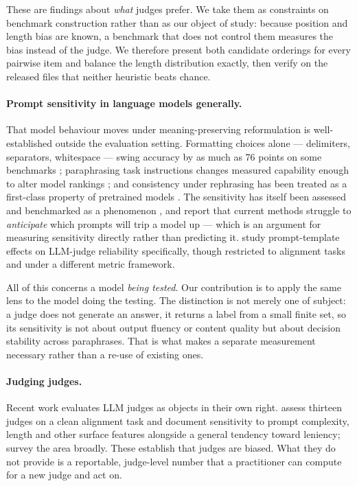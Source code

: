 \documentclass[11pt]{article}          %
\begin{document}
These are findings about \emph{what} judges prefer. We take them as constraints
on benchmark construction rather than as our object of study: because position
and length bias are known, a benchmark that does not control them measures the
bias instead of the judge. We therefore present both candidate orderings for
every pairwise item and balance the length distribution exactly, then verify on
the released files that neither heuristic beats chance.

\paragraph{Prompt sensitivity in language models generally.}
That model behaviour moves under meaning-preserving reformulation is
well-established outside the evaluation setting. Formatting choices alone ---
delimiters, separators, whitespace --- swing accuracy by as much as 76 points on
some benchmarks \citep{sclar2024quantifying}; paraphrasing task instructions
changes measured capability enough to alter model rankings
\citep{mizrahi2024state}; and consistency under rephrasing has been treated as a
first-class property of pretrained models \citep{elazar2021measuring}. The
sensitivity has itself been assessed and benchmarked as a phenomenon
\citep{zhuo2024prosa, razavi2025benchmarking}, and \citet{razavi2025benchmarking}
report that current methods struggle to \emph{anticipate} which prompts will trip
a model up --- which is an argument for measuring sensitivity directly rather
than predicting it. \citet{wei2024systematic} study prompt-template effects on
LLM-judge reliability specifically, though restricted to alignment tasks and
under a different metric framework.

All of this concerns a model \emph{being tested}. Our contribution is to apply the
same lens to the model doing the testing. The distinction is not merely one of
subject: a judge does not generate an answer, it returns a label from a small
finite set, so its sensitivity is not about output fluency or content quality but
about decision stability across paraphrases. That is what makes a separate
measurement necessary rather than a re-use of existing ones.

\paragraph{Judging judges.}
Recent work evaluates LLM judges as objects in their own right.
\citet{thakur2024judging} assess thirteen judges on a clean alignment task and
document sensitivity to prompt complexity, length and other surface features
alongside a general tendency toward leniency; \citet{li2024llms} survey the area
broadly. These establish that judges are biased. What they do not provide is a
reportable, judge-level number that a practitioner can compute for a new judge
and act on.
\end{document}
